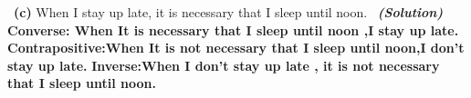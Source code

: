 \documentclass[a4 paper]{article}
\numberwithin{equation}{section}
\newcommand{\subproblem}[1]{~\newline\textbf{(#1)}}
\newcommand{\solution}{~\newline\textbf{\textit{(Solution)}} }
\newcommand{\0}{\mathbf{0}}
\begin{document}
\subproblem{c} When I stay up late, it is necessary that I sleep until
noon.
\solution
\newline
\newline
\textbf{Converse: When It is necessary that I sleep until noon ,I stay up late.}
\newline
\newline
\textbf{Contrapositive:When It is not necessary that I sleep until noon,I don’t stay up late. }
\newline
\newline
\textbf{Inverse:When I don’t stay up late , it is not necessary that I sleep until noon. }
\newline
\newline
\end{document}

